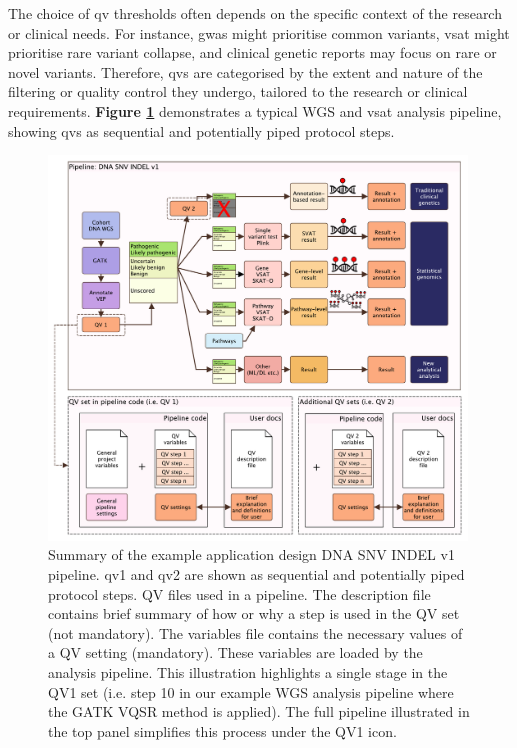 The choice of \ac{qv} thresholds often depends on the specific context of the research or clinical needs. 
For instance, \ac{gwas} might prioritise common variants, 
\ac{vsat} might prioritise rare variant collapse, 
and clinical genetic reports may focus on rare or novel variants. 
Therefore, \ac{qv}s are categorised by the extent and nature of the filtering or quality control they undergo, tailored to the research or clinical requirements. 
\textbf{Figure \ref{fig:qv_pipeline_with_file_vcurrent}} 
demonstrates a typical WGS and \ac{vsat} analysis pipeline, showing \ac{qv}s as sequential and potentially piped protocol steps.


\begin{figure}[h]
    \centering
   \includegraphics[width=0.99\textwidth]{./images/qv_pipeline_with_file_vcurrent.pdf}
    \caption{Summary of the example application design DNA SNV INDEL v1 pipeline. \ac{qv}1 and \ac{qv}2 are shown as sequential and potentially piped protocol steps.
    QV files used in a pipeline. The description file contains brief summary of how or why a step is used in the QV set (not mandatory). The variables file contains the necessary values of a QV setting (mandatory). These variables are loaded by the analysis pipeline. This illustration highlights a single stage in the QV1 set (i.e. step 10 in our example WGS analysis pipeline where the GATK VQSR method is applied). The full pipeline illustrated in the top panel simplifies this process under the QV1 icon.
    }
    \label{fig:qv_pipeline_with_file_vcurrent}
\end{figure}

